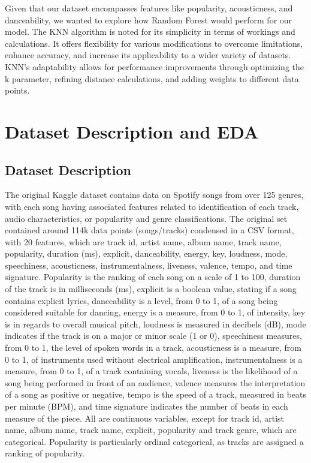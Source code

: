 \documentclass[times, twocolumn]{article}
\begin{document}
Given that our dataset encompasses features like popularity, acousticness, and danceability, we wanted to explore how Random Forest would perform for our model. The KNN algorithm is noted for its simplicity in terms of workings and calculations. It offers flexibility for various modifications to overcome limitations, enhance accuracy, and increase its applicability to a wider variety of datasets. KNN's adaptability allows for performance improvements through optimizing the k parameter, refining distance calculations, and adding weights to different data points.

\section{Dataset Description and EDA}
\subsection{Dataset Description}
The original Kaggle dataset contains data on Spotify songs from over 125 genres, with each song having associated features related to identification of each track, audio characteristics, or popularity and genre classifications. The original set contained around 114k data points (songs/tracks) condensed in a CSV format, with 20 features, which are track id, artist name, album name, track name, popularity, duration (ms), explicit, danceability, energy, key, loudness, mode, speechiness, acousticness, instrumentalness, liveness, valence, tempo, and time signature. Popularity is the ranking of each song on a scale of 1 to 100, duration of the track is in milliseconds (ms), explicit is a boolean value, stating if a song contains explicit lyrics, danceability is a level, from 0 to 1, of a song being considered suitable for dancing, energy is a measure, from 0 to 1, of intensity, key is in regards to overall musical pitch, loudness is measured in decibels (dB), mode indicates if the track is on a major or minor scale (1 or 0), speechiness measures, from 0 to 1, the level of spoken words in a track, acousticness is a measure, from 0 to 1, of instruments used without electrical amplification, instrumentalness is a measure, from 0 to 1, of a track containing vocals, liveness is the likelihood of a song being performed in front of an audience, valence measures the interpretation of a song as positive or negative, tempo is the speed of a track, measured in beats per minute (BPM), and time signature indicates the number of beats in each measure of the piece. All are continuous variables, except for track id, artist name, album name, track name, explicit, popularity and track genre, which are categorical. Popularity is particularly ordinal categorical, as tracks are assigned a ranking of popularity. 
\end{document}
